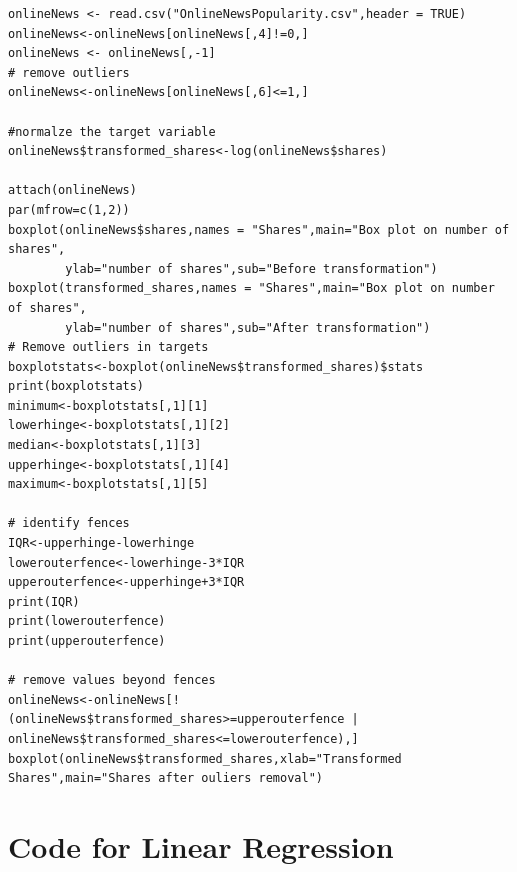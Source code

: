 \documentclass[letterpaper,12pt]{article}
\begin{document}

\begin{lstlisting}
onlineNews <- read.csv("OnlineNewsPopularity.csv",header = TRUE)
onlineNews<-onlineNews[onlineNews[,4]!=0,]
onlineNews <- onlineNews[,-1]
# remove outliers
onlineNews<-onlineNews[onlineNews[,6]<=1,]

#normalze the target variable 
onlineNews$transformed_shares<-log(onlineNews$shares)

attach(onlineNews)
par(mfrow=c(1,2))
boxplot(onlineNews$shares,names = "Shares",main="Box plot on number of shares",
        ylab="number of shares",sub="Before transformation")
boxplot(transformed_shares,names = "Shares",main="Box plot on number of shares",
        ylab="number of shares",sub="After transformation")
# Remove outliers in targets
boxplotstats<-boxplot(onlineNews$transformed_shares)$stats
print(boxplotstats)
minimum<-boxplotstats[,1][1]
lowerhinge<-boxplotstats[,1][2]
median<-boxplotstats[,1][3]
upperhinge<-boxplotstats[,1][4]
maximum<-boxplotstats[,1][5]

# identify fences
IQR<-upperhinge-lowerhinge
lowerouterfence<-lowerhinge-3*IQR
upperouterfence<-upperhinge+3*IQR
print(IQR)
print(lowerouterfence)
print(upperouterfence)

# remove values beyond fences
onlineNews<-onlineNews[!(onlineNews$transformed_shares>=upperouterfence | onlineNews$transformed_shares<=lowerouterfence),]
boxplot(onlineNews$transformed_shares,xlab="Transformed Shares",main="Shares after ouliers removal")
\end{lstlisting}

\section{Code for Linear Regression}
\end{document}
